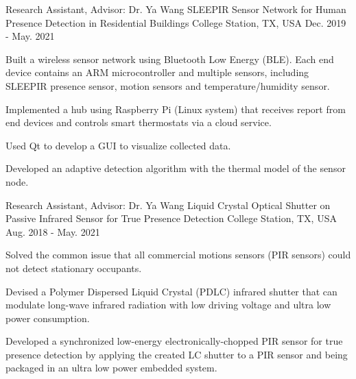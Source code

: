 

\begin{cventries}

  \cventry
    {Research Assistant, Advisor: Dr. Ya Wang} %
    {SLEEPIR Sensor Network for Human Presence Detection in Residential Buildings} %
    {College Station, TX, USA} %
    {Dec. 2019 - May. 2021} %
    {
      \begin{cvitems} %
        \item Built a wireless sensor network using Bluetooth Low Energy (BLE). Each end device contains an ARM microcontroller and multiple sensors, including SLEEPIR presence sensor, motion sensors and temperature/humidity sensor.
        \item Implemented a hub using Raspberry Pi (Linux system) that receives report from end devices and controls smart thermostats via a cloud service.
        \item Used Qt to develop a GUI to visualize collected data.
        \item Developed an adaptive detection algorithm with the thermal model of the sensor node.
      \end{cvitems}
    }
  \cventry
    {Research Assistant, Advisor: Dr. Ya Wang} %
    {Liquid Crystal Optical Shutter on Passive Infrared Sensor for True Presence Detection} %
    {College Station, TX, USA} %
    {Aug. 2018 - May. 2021} %
    {
      \begin{cvitems} %
        \item Solved the common issue that all commercial motions sensors (PIR sensors) could not detect stationary occupants.
        \item Devised a Polymer Dispersed Liquid Crystal (PDLC) infrared shutter that can modulate long-wave infrared radiation with low driving voltage and ultra low power consumption.
        \item Developed a synchronized low-energy electronically-chopped PIR sensor for true presence detection by applying the created LC shutter to a PIR sensor and being packaged in an ultra low power embedded system.

\end{cvitems}}
\end{cventries}

